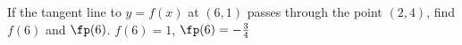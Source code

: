 {If the tangent line to $y=f(x)$ at $(6,1)$ passes through the point $(2,4)$, find $f(6)$ and $\fp(6)$.}
{$f(6)=1$, $\fp(6)=-\frac34$}
